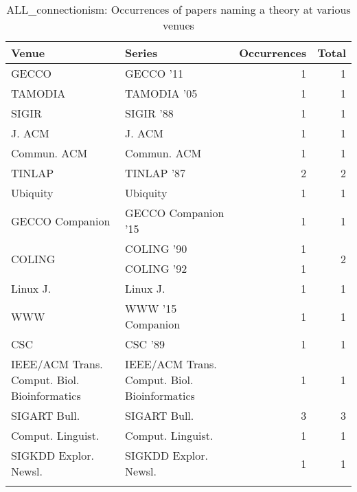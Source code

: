 \begin{table*}[t]
\begin{tabular}{llrr}
Venue & Series & Occurrences & Total\\\hline
\multirow{1}{*}{GECCO } & GECCO '11 & 1 & \multirow{1}{*}{1}\\
\multirow{1}{*}{TAMODIA } & TAMODIA '05 & 1 & \multirow{1}{*}{1}\\
\multirow{1}{*}{SIGIR } & SIGIR '88 & 1 & \multirow{1}{*}{1}\\
\multirow{1}{*}{J. ACM} & J. ACM & 1 & \multirow{1}{*}{1}\\
\multirow{1}{*}{Commun. ACM} & Commun. ACM & 1 & \multirow{1}{*}{1}\\
\multirow{1}{*}{TINLAP } & TINLAP '87 & 2 & \multirow{1}{*}{2}\\
\multirow{1}{*}{Ubiquity} & Ubiquity & 1 & \multirow{1}{*}{1}\\
\multirow{1}{*}{GECCO Companion } & GECCO Companion '15 & 1 & \multirow{1}{*}{1}\\
\multirow{2}{*}{COLING } & COLING '90 & 1 & \multirow{2}{*}{2}\\
& COLING '92 & 1 &\\
\multirow{1}{*}{Linux J.} & Linux J. & 1 & \multirow{1}{*}{1}\\
\multirow{1}{*}{WWW } & WWW '15 Companion & 1 & \multirow{1}{*}{1}\\
\multirow{1}{*}{CSC } & CSC '89 & 1 & \multirow{1}{*}{1}\\
\multirow{1}{*}{IEEE/ACM Trans. Comput. Biol. Bioinformatics} & IEEE/ACM Trans. Comput. Biol. Bioinformatics & 1 & \multirow{1}{*}{1}\\
\multirow{1}{*}{SIGART Bull.} & SIGART Bull. & 3 & \multirow{1}{*}{3}\\
\multirow{1}{*}{Comput. Linguist.} & Comput. Linguist. & 1 & \multirow{1}{*}{1}\\
\multirow{1}{*}{SIGKDD Explor. Newsl.} & SIGKDD Explor. Newsl. & 1 & \multirow{1}{*}{1}\\
\caption{ALL_connectionism: Occurrences of papers naming a theory at various venues}
\end{tabular}
\end{table*}